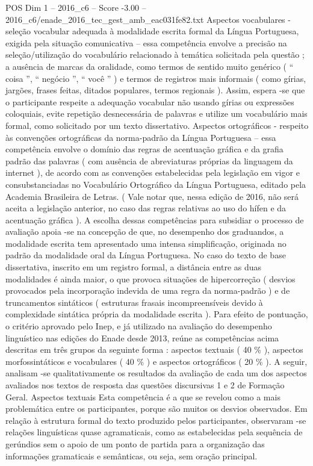 \begin{textsample}{POS Dim 1 – 2016\_c6 – Score -3.00 – 2016\_c6/enade\_2016\_tec\_gest\_amb\_eac031fe82.txt}
Aspectos vocabulares - seleção vocabular adequada à modalidade escrita formal da Língua Portuguesa, exigida pela situação comunicativa – essa competência envolve a precisão na seleção/utilização do vocabulário relacionado à temática solicitada pela questão ; a ausência de marcas da oralidade, como termos de sentido muito genérico ( “ coisa ”, “ negócio ”, “ você ” ) e termos de registros mais informais ( como gírias, jargões, frases feitas, ditados populares, termos regionais ).
Assim, espera -se que o participante respeite a adequação vocabular não usando gírias ou expressões coloquiais, evite repetição desnecessária de palavras e utilize um vocabulário mais formal, como solicitado por um texto dissertativo.
Aspectos ortográficos - respeito às convenções ortográficas da norma-padrão da Língua Portuguesa – essa competência envolve o domínio das regras de acentuação gráfica e da grafia padrão das palavras ( com ausência de abreviaturas próprias da linguagem da internet ), de acordo com as convenções estabelecidas pela legislação em vigor e consubstanciadas no Vocabulário Ortográfico da Língua Portuguesa, editado pela Academia Brasileira de Letras. ( Vale notar que, nessa edição de 2016, não será aceita a legislação anterior, no caso das regras relativas ao uso do hífen e da acentuação gráfica ).
A escolha dessas competências para subsidiar o processo de avaliação apoia -se na concepção de que, no desempenho dos graduandos, a modalidade escrita tem apresentado uma intensa simplificação, originada no padrão da modalidade oral da Língua Portuguesa.
No caso do texto de base dissertativa, inscrito em um registro formal, a distância entre as duas modalidades é ainda maior, o que provoca situações de hipercorreção ( desvios provocados pela incorporação indevida de uma regra da norma-padrão ) e de truncamentos sintáticos ( estruturas frasais incompreensíveis devido à complexidade sintática própria da modalidade escrita ).
Para efeito de pontuação, o critério aprovado pelo Inep, e já utilizado na avaliação do desempenho linguístico nas edições do Enade desde 2013, reúne as competências acima descritas em três grupos da seguinte forma : aspectos textuais ( 40 \% ), aspectos morfossintáticos e vocabulares ( 40 \% ) e aspectos ortográficos ( 20 \% ).
A seguir, analisam -se qualitativamente os resultados da avaliação de cada um dos aspectos avaliados nos textos de resposta das questões discursivas 1 e 2 de Formação Geral.
Aspectos textuais Esta competência é a que se revelou como a mais problemática entre os participantes, porque são muitos os desvios observados.
Em relação à estrutura formal do texto produzido pelos participantes, observaram -se relações linguísticas quase agramaticais, como as estabelecidas pela sequência de gerúndios sem o apoio de um ponto de partida para a organização das informações gramaticais e semânticas, ou seja, sem oração principal.

\end{textsample}
